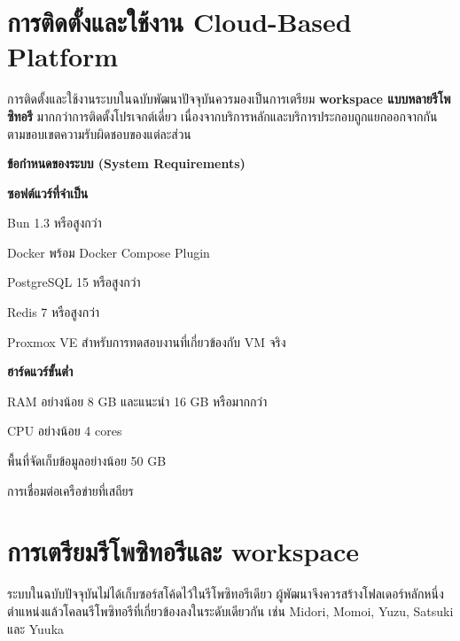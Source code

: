 \vspace{-0.5in}

\section{การติดตั้งและใช้งาน Cloud-Based Platform}
\hspace*{1.3em}
การติดตั้งและใช้งานระบบในฉบับพัฒนาปัจจุบันควรมองเป็นการเตรียม \textbf{workspace แบบหลายรีโพซิทอรี} มากกว่าการติดตั้งโปรเจกต์เดี่ยว เนื่องจากบริการหลักและบริการประกอบถูกแยกออกจากกันตามขอบเขตความรับผิดชอบของแต่ละส่วน

\vspace{0.5em}
\textbf{ข้อกำหนดของระบบ (System Requirements)}
\vspace{0.5em}

\begin{mycustomenum2}
    \item \textbf{ซอฟต์แวร์ที่จำเป็น}
    \begin{mycustomenum2}
        \item Bun 1.3 หรือสูงกว่า
        \item Docker พร้อม Docker Compose Plugin
        \item PostgreSQL 15 หรือสูงกว่า
        \item Redis 7 หรือสูงกว่า
        \item Proxmox VE สำหรับการทดสอบงานที่เกี่ยวข้องกับ VM จริง
    \end{mycustomenum2}
    \item \textbf{ฮาร์ดแวร์ขั้นต่ำ}
    \begin{mycustomenum2}
        \item RAM อย่างน้อย 8 GB และแนะนำ 16 GB หรือมากกว่า
        \item CPU อย่างน้อย 4 cores
        \item พื้นที่จัดเก็บข้อมูลอย่างน้อย 50 GB
        \item การเชื่อมต่อเครือข่ายที่เสถียร
    \end{mycustomenum2}
\end{mycustomenum2}

\section{การเตรียมรีโพซิทอรีและ workspace}
\hspace*{1.3em}
ระบบในฉบับปัจจุบันไม่ได้เก็บซอร์สโค้ดไว้ในรีโพซิทอรีเดียว ผู้พัฒนาจึงควรสร้างโฟลเดอร์หลักหนึ่งตำแหน่งแล้วโคลนรีโพซิทอรีที่เกี่ยวข้องลงในระดับเดียวกัน เช่น Midori, Momoi, Yuzu, Satsuki และ Yuuka

